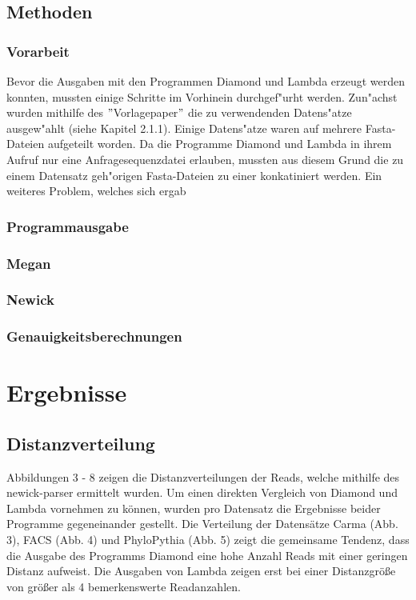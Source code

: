 \documentclass[10pt, a4paper]{article}[08.12.2015]
\begin{document}
    \subsection{Methoden}
      \subsubsection{Vorarbeit}
      Bevor die Ausgaben mit den Programmen Diamond und Lambda erzeugt werden konnten, mussten einige Schritte im Vorhinein durchgef"urht werden. Zun"achst wurden mithilfe des $"$Vorlagepaper$"$ \cite{bazinet2012} die zu verwendenden Datens"atze ausgew"ahlt (siehe Kapitel 2.1.1). Einige Datens"atze waren auf mehrere Fasta-Dateien aufgeteilt worden. Da die Programme Diamond und Lambda in ihrem Aufruf nur eine Anfragesequenzdatei erlauben, mussten aus diesem Grund die zu einem Datensatz geh"origen Fasta-Dateien zu einer konkatiniert werden. \newline
      Ein weiteres Problem, welches sich ergab 
      \subsubsection{Programmausgabe}
      \subsubsection{Megan}
      \subsubsection{Newick}
      \subsubsection{Genauigkeitsberechnungen}
    
  
    \newpage
  \section{Ergebnisse}
  \subsection{Distanzverteilung}
  
  Abbildungen 3 - 8 zeigen die Distanzverteilungen der Reads, welche mithilfe des newick-parser ermittelt wurden. Um einen direkten Vergleich von Diamond und Lambda vornehmen zu k\"onnen, wurden pro Datensatz die Ergebnisse beider Programme gegeneinander gestellt. Die Verteilung der Datens\"atze Carma (Abb. 3), FACS (Abb. 4) und PhyloPythia (Abb. 5) zeigt die gemeinsame Tendenz, dass die Ausgabe des Programms Diamond eine hohe Anzahl Reads mit einer geringen Distanz aufweist. Die Ausgaben von Lambda zeigen erst bei einer Distanzgr\"o{\ss}e von gr\"o{\ss}er als 4 bemerkenswerte Readanzahlen.
  
\end{document}
